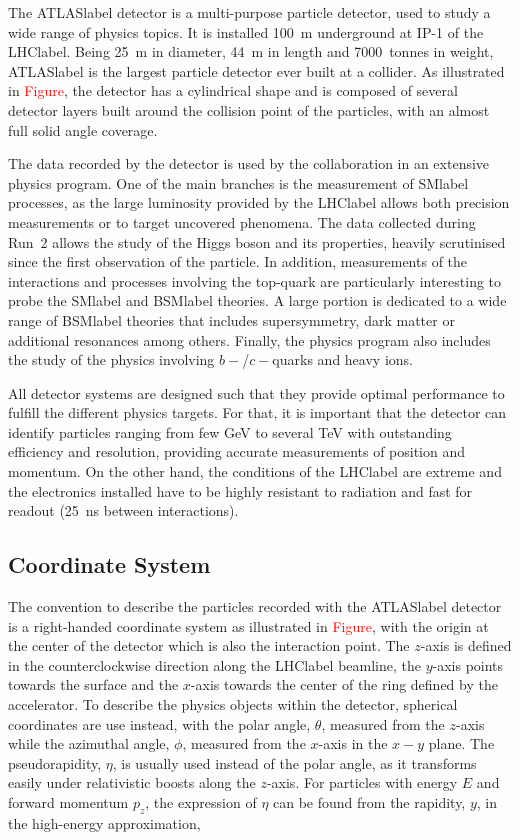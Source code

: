 The \acrshort{ATLASlabel} detector is a multi-purpose particle detector, used to study a wide range of physics topics. It is installed 100~m underground at IP-1 of the \acrshort{LHClabel}. Being 25~m in diameter, 44~m in length and 7000~tonnes in weight, \acrshort{ATLASlabel} is the largest particle detector ever built at a collider. As illustrated in \textcolor{red}{Figure}, the detector has a cylindrical shape and is composed of several detector layers built around the collision point of the particles, with an almost full solid angle coverage.

The data recorded by the detector is used by the collaboration in an extensive physics program. One of the main branches is the measurement of \acrshort{SMlabel} processes, as the large luminosity provided by the \acrshort{LHClabel} allows both precision measurements or to target uncovered phenomena. The data collected during Run~2 allows the study of the Higgs boson and its properties, heavily scrutinised since the first observation of the particle. In addition, measurements of the interactions and processes involving the top-quark are particularly interesting to probe the \acrshort{SMlabel} and \acrshort{BSMlabel} theories. A large portion is dedicated to a wide range of \acrshort{BSMlabel} theories that includes supersymmetry, dark matter or additional resonances among others. Finally, the physics program also includes the study of the physics involving $b-$/$c-$quarks and heavy ions.

All detector systems are designed such that they provide optimal performance to fulfill the different physics targets. For that, it is important that the detector can identify particles ranging from few GeV to several TeV with outstanding efficiency and resolution, providing accurate measurements of position and momentum. On the other hand, the conditions of the \acrshort{LHClabel} are extreme and the electronics installed have to be highly resistant to radiation and fast for readout (25~ns between interactions).

\subsection{Coordinate System}

The convention to describe the particles recorded with the \acrshort{ATLASlabel} detector is a right-handed coordinate system as illustrated in \textcolor{red}{Figure}, with the origin at the center of the detector which is also the interaction point. The $z$-axis is defined in the counterclockwise direction along the \acrshort{LHClabel} beamline, the $y$-axis points towards the surface and the $x$-axis towards the center of the ring defined by the accelerator. To describe the physics objects within the detector, spherical coordinates are use instead, with the polar angle, $\theta$, measured from the $z$-axis while the azimuthal angle, $\phi$, measured from the $x$-axis in the $x-y$ plane. The pseudorapidity, $\eta$, is usually used instead of the polar angle, as it transforms easily under relativistic boosts along the $z$-axis. For particles with energy $E$ and forward momentum $p_z$, the expression of $\eta$ can be found from the rapidity, $y$, in the high-energy approximation,

